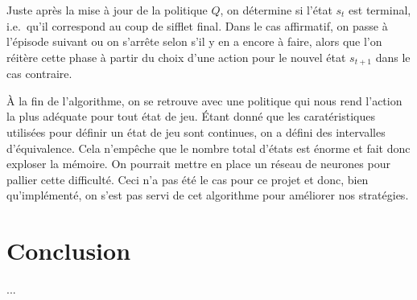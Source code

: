 \documentclass[12pt,a4paper]{article}
\begin{document}
Juste apr\`es la mise \`a jour de la politique $Q$, on d\'etermine si l'\'etat 
$s_t$ est terminal, i.e.\ qu'il correspond au coup de sifflet final. Dans le 
cas affirmatif, on passe \`a l'\'episode suivant ou on s'arr\^ete selon s'il y 
en a encore \`a faire, alors que l'on r\'eit\`ere cette phase \`a partir du 
choix d'une action pour le nouvel \'etat $s_{t+1}$ dans le cas contraire.

\`A la fin de l'algorithme, on se retrouve avec une politique qui nous rend 
l'action la plus ad\'equate pour tout \'etat de jeu. \'Etant donn\'e que les 
carat\'eristiques utilis\'ees pour d\'efinir un \'etat de jeu sont continues, 
on a d\'efini des intervalles d'\'equivalence. Cela n'emp\^eche que le nombre 
total d'\'etats est \'enorme et fait donc exploser la m\'emoire. On pourrait 
mettre en place un r\'eseau de neurones pour pallier cette difficult\'e. Ceci 
n'a pas \'et\'e le cas pour ce projet et donc, bien qu'impl\'ement\'e, on 
s'est pas servi de cet algorithme pour am\'eliorer nos strat\'egies. 

\newpage

\part*{Conclusion}
...
\end{document}
